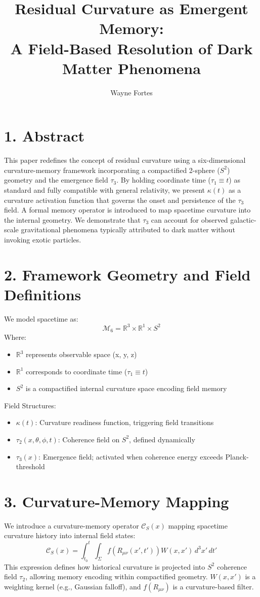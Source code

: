 \documentclass[12pt]{article}
\title{Residual Curvature as Emergent Memory:\\ A Field-Based Resolution of Dark Matter Phenomena}
\author{Wayne Fortes}
\date{}
\begin{document}
\maketitle

\section*{1. Abstract}
This paper redefines the concept of residual curvature using a six-dimensional curvature-memory framework incorporating a compactified 2-sphere ($S^2$) geometry and the emergence field $\tau_3$. By holding coordinate time ($\tau_1 \equiv t$) as standard and fully compatible with general relativity, we present $\kappa(t)$ as a curvature activation function that governs the onset and persistence of the $\tau_3$ field. A formal memory operator is introduced to map spacetime curvature into the internal geometry. We demonstrate that $\tau_3$ can account for observed galactic-scale gravitational phenomena typically attributed to dark matter without invoking exotic particles.

\section*{2. Framework Geometry and Field Definitions}
We model spacetime as:
\[
\mathcal{M}_6 = \mathbb{R}^3 \times \mathbb{R}^1 \times S^2
\]
Where:
\begin{itemize}
    \item $\mathbb{R}^3$ represents observable space (x, y, z)
    \item $\mathbb{R}^1$ corresponds to coordinate time ($\tau_1 \equiv t$)
    \item $S^2$ is a compactified internal curvature space encoding field memory
\end{itemize}
Field Structures:
\begin{itemize}
    \item $\kappa(t)$: Curvature readiness function, triggering field transitions
    \item $\tau_2(x, \theta, \phi, t)$: Coherence field on $S^2$, defined dynamically
    \item $\tau_3(x)$: Emergence field; activated when coherence energy exceeds Planck-threshold
\end{itemize}

\section*{3. Curvature-Memory Mapping}
We introduce a curvature-memory operator $\mathcal{C}_S(x)$ mapping spacetime curvature history into internal field states:
\[
\mathcal{C}_S(x) = \int_{t_0}^{t} \int_{\Sigma} f(R_{\mu\nu}(x', t')) W(x, x') \, d^3x' \, dt'
\]
This expression defines how historical curvature is projected into $S^2$ coherence field $\tau_2$, allowing memory encoding within compactified geometry. $W(x, x')$ is a weighting kernel (e.g., Gaussian falloff), and $f(R_{\mu\nu})$ is a curvature-based filter.
\end{document}
